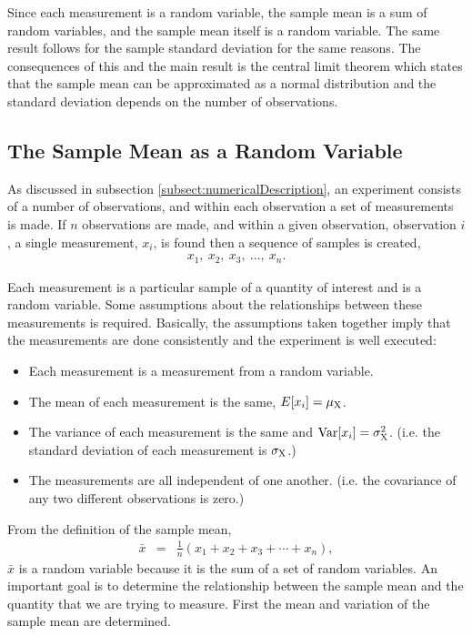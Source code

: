 \documentclass[12pt]{article}
\newcommand{\lp}{\left(}
\newcommand{\rp}{\right)}
\begin{document}
Since each measurement is a random variable, the sample mean is a sum
of random variables, and the sample mean itself is a random variable.
The same result follows for the sample standard deviation for the same
reasons. The consequences of this and the main result is the central
limit theorem which states that the sample mean can be approximated as
a normal distribution and the standard deviation depends on the number
of observations.

\subsection{The Sample Mean as a Random Variable}
\label{subsect:sampleMeanRV}

As discussed in subsection \ref{subsect:numericalDescription}, an
experiment consists of a number of observations, and within each
observation a set of measurements is made. If $n$ observations are
made, and within a given observation, observation $i$, a single
measurement, $x_i$, is found then a sequence of samples is created,
\begin{eqnarray*}
  x_1, ~ x_2, ~ x_3, ~\ldots,~x_n.
\end{eqnarray*}

Each measurement is a particular sample of a quantity of interest and
is a random variable. Some assumptions about the relationships between
these measurements is required. Basically, the assumptions taken
together imply that the measurements are done consistently and the
experiment is well executed:
\begin{itemize}
\item Each measurement is a measurement from a random variable.
\item The mean of each measurement is the same, $E[x_i]=\mu_{\rm X}$.
\item The variance of each measurement is the same and
  $\mathrm{Var}[x_i]=\sigma_{\rm X}^2$. (i.e. the standard deviation of
  each measurement is $\sigma_{\rm X}$.)
\item The measurements are all independent of one another. (i.e. the
  covariance of any two different observations is zero.)
\end{itemize}

From the definition of the sample mean,
\begin{eqnarray*}
  \bar{x} & = & \frac{1}{n} \lp x_1+x_2+x_3+\cdots +x_n \rp,
\end{eqnarray*}
$\bar{x}$ is a random variable because it is the sum of a set of
random variables. An important goal is to determine the relationship
between the sample mean and the quantity that we are trying to
measure. First the mean and variation of the sample mean are
determined.
\end{document}
